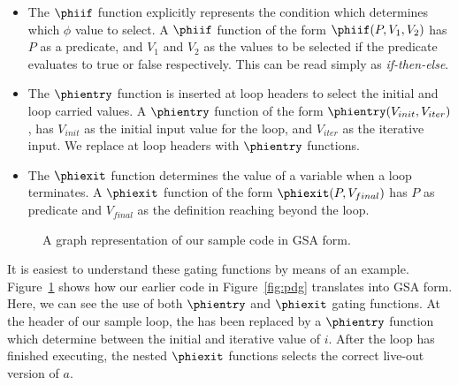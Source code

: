 \begin{itemize}
\item The $\phiif$ function explicitly represents the condition which determines which $\phi$ value to select. A $\phiif$ function of the form $\phiif(P,V_{1},V_{2})$ has $P$ as a predicate, and $V_{1}$ and $V_{2}$ as the values to be selected if the predicate evaluates to true or false respectively. This can be read simply as \textit{if-then-else}. 
\item The $\phientry$ function is inserted at loop headers to select the initial and loop carried values. A $\phientry$ function of the form $\phientry(V_{init},V_{iter})$, has $V_{init}$ as the initial input value for the loop, and $V_{iter}$ as the iterative input. We replace \phifuns at loop headers with $\phientry$ functions.
\item The $\phiexit$ function determines the value of a variable when a loop terminates. A $\phiexit$ function of the form $\phiexit(P,V_{final})$ has $P$ as predicate and $V_{final}$ as the definition reaching beyond the loop.
\end{itemize}

\begin{figure}
\centering
{}
\caption{A graph representation of our sample code in GSA form.}
\label{fig: gsa-graph-example}
\end{figure}

It is easiest to understand these gating functions by means of an example. Figure~\ref{fig: gsa-graph-example} shows how our earlier code in Figure~\ref{fig:pdg} translates into GSA form. Here, we can see the use of both $\phientry$ and $\phiexit$ gating functions. At the header of our sample loop, the \phifun has been replaced by a $\phientry$ function which determine between the initial and iterative value of $i$. After the loop has finished executing, the nested $\phiexit$ functions selects the correct live-out version of $a$.

